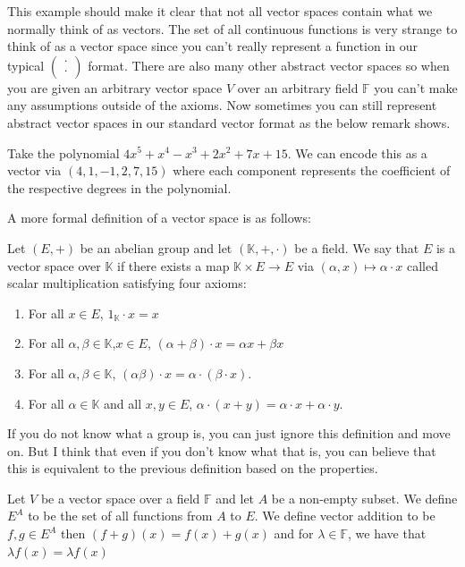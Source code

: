 This example should make it clear that not all vector spaces contain what we normally think of as vectors. The set of all continuous functions is very strange to think of as a vector space since you can't really represent a function in our typical $\begin{pmatrix}
    \cdot \\ \cdot
\end{pmatrix}$ format. There are also many other abstract vector spaces so when you are given an arbitrary vector space $V$ over an arbitrary field $\mathbb{F}$ you can't make any assumptions outside of the axioms. Now sometimes you can still represent abstract vector spaces in our standard vector format as the below remark shows.
\begin{remark}
    Take the polynomial $4x^5+x^4-x^3+2x^2+7x+15$. We can encode this as a vector via $(4, 1, -1, 2, 7, 15)$ where each component represents the coefficient of the respective degrees in the polynomial.
\end{remark}
A more formal definition of a vector space is as follows:
\begin{definition}
    Let $(E,+)$ be an abelian group and let $(\mathbb{K}, +,\cdot)$ be a field. We say that $E$ is a vector space over $\mathbb{K}$ if there exists a map $\mathbb{K}\times E\to E$ via $(\alpha,x)\mapsto\alpha\cdot x$ called scalar multiplication satisfying four axioms:
    \begin{enumerate}
        \item For all $x\in E$, $1_\mathbb{K}\cdot x=x$
        \item For all $\alpha,\beta\in\mathbb{K}$,$x\in E$, $(\alpha+\beta)\cdot x=\alpha x+\beta x$
        \item For all $\alpha,\beta\in\mathbb{K}$, $(\alpha\beta)\cdot x=\alpha\cdot(\beta\cdot x)$.
        \item For all $\alpha\in\mathbb{K}$ and all $x,y\in E$, $\alpha\cdot(x+y)=\alpha\cdot x+\alpha\cdot y$.
    \end{enumerate}
\end{definition}
If you do not know what a group is, you can just ignore this definition and move on. But I think that even if you don't know what that is, you can believe that this is equivalent to the previous definition based on the properties.

\begin{example}
    Let $V$ be a vector space over a field $\mathbb{F}$ and let $A$ be a non-empty subset. We define $E^A$ to be the set of all functions from $A$ to $E$. We define vector addition to be $f,g\in E^A$ then $(f+g)(x)=f(x)+g(x)$ and for $\lambda\in\mathbb{F}$, we have that $\lambda f(x)=\lambda f(x)$
\end{example}

